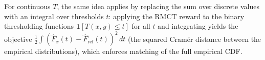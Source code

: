 For continuous $T$, the same idea applies by replacing the sum over discrete values with an integral over thresholds $t$: applying the RMCT reward to the binary thresholding functions $\mathbf{1}[T(x, y) \leq t]$ for all $t$ and integrating yields the objective $\frac{1}{2}\int(\hat{F}_x(t) - \hat{F}_{\text{ref}}(t))^2\,dt$ (the squared Cram\'{e}r distance between the empirical distributions), which enforces matching of the full empirical CDF.
